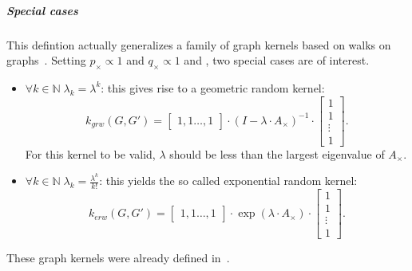                 \subparagraph{Special cases}
                    This defintion actually generalizes a family of graph kernels based on walks on graphs~\parencite{vishwanathan2010graph}.
                    Setting $p_{\times} \propto 1$ and $q_{\times} \propto 1$ and , two special cases are of interest.
                    \begin{itemize}
                        \item $\forall k\in \mathbb{N} \; \lambda_k = \lambda^k$: this gives rise to a geometric random kernel:
                                \begin{equation}
                                    \label{eq::geometric_random_kernel}
                                    k_{grw}(G, G') = \begin{bmatrix}
                                        1, 1\dots,1
                                    \end{bmatrix}\cdot \left(I - \lambda\cdot A_{\times}\right)^{-1}\cdot\begin{bmatrix}
                                        1\\
                                        1\\
                                        \vdots\\
                                        1
                                    \end{bmatrix}.
                                \end{equation}
                                For this kernel to be valid, $\lambda$ should be less than the largest eigenvalue of $A_{\times}$.
                        \item $\forall k\in \mathbb{N} \; \lambda_k = \frac{\lambda^k}{k!}$: this yields the so called exponential random kernel:
                                \begin{equation}
                                    \label{eq::geometric_random_kernel}
                                    k_{erw}(G, G') = \begin{bmatrix}
                                        1, 1\dots,1
                                    \end{bmatrix}\cdot \exp\left(\lambda\cdot A_{\times}\right)\cdot\begin{bmatrix}
                                        1\\
                                        1\\
                                        \vdots\\
                                        1
                                    \end{bmatrix}.
                                \end{equation}
                    \end{itemize}
                    These graph kernels were already defined in~\parencite{gartner2003graph}.\\

